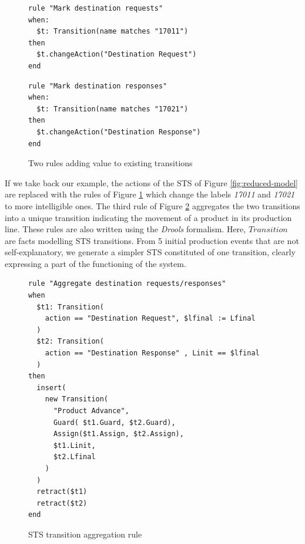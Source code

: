 \begin{figure}[ht]
\begin{framed}
\begin{BVerbatim}
rule "Mark destination requests"
when:
  $t: Transition(name matches "17011")
then
  $t.changeAction("Destination Request")
end
\end{BVerbatim}
\end{framed}

\begin{framed}
\begin{BVerbatim}
rule "Mark destination responses"
when:
  $t: Transition(name matches "17021")
then
  $t.changeAction("Destination Response")
end
\end{BVerbatim}
\end{framed}

  \caption{Two rules adding value to existing transitions}
  \label{rule:rename-tr}
\end{figure}

If we take back our example, the actions of the STS of Figure
\ref{fig:reduced-model} are replaced with the rules of Figure
\ref{rule:rename-tr} which change the labels \textit{17011} and
\textit{17021} to more intelligible ones. The third rule of
Figure \ref{rule:aggregate-tr} aggregates the two transitions
into a unique transition indicating the movement of a product in
its production line. These rules are also written using the
\textit{Drools} formalism. Here, $Transition$ are facts modelling
STS transitions. From 5 initial production events that are not
self-explanatory, we generate a simpler STS constituted of one
transition, clearly expressing a part of the functioning of the
system.

\begin{figure}[ht]
\begin{framed}
\begin{BVerbatim}
rule "Aggregate destination requests/responses"
when
  $t1: Transition(
    action == "Destination Request", $lfinal := Lfinal
  )
  $t2: Transition(
    action == "Destination Response" , Linit == $lfinal
  )
then
  insert(
    new Transition(
      "Product Advance",
      Guard( $t1.Guard, $t2.Guard),
      Assign($t1.Assign, $t2.Assign),
      $t1.Linit,
      $t2.Lfinal
    )
  )
  retract($t1)
  retract($t2)
end
\end{BVerbatim}
\end{framed}

  \caption{STS transition aggregation rule}
  \label{rule:aggregate-tr}
\end{figure}

